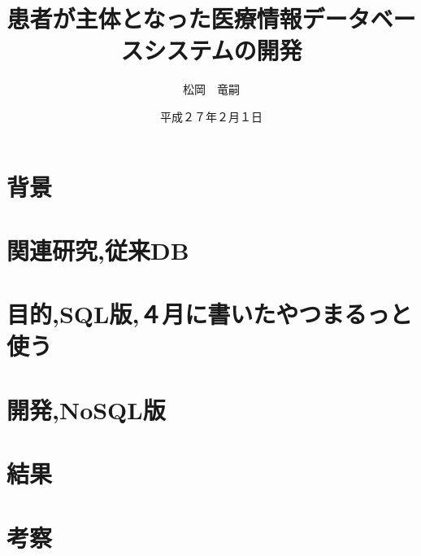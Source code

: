 \documentclass[12pt]{sotsuron}
\title{患者が主体となった医療情報データベースシステムの開発}
\author{松岡　竜嗣}
\date{平成２７年２月１日}
\affiliation{電子機械工学専攻}
\begin{document}
\maketitle

\begin{abstract}

\end{abstract}

\tableofcontents
\clearpage


\section{背景}


\section{関連研究,従来DB}


\section{目的,SQL版,４月に書いたやつまるっと使う}


\section{開発,NoSQL版}


\section{結果}


\section{考察}



\appendix

%
\end{document}
